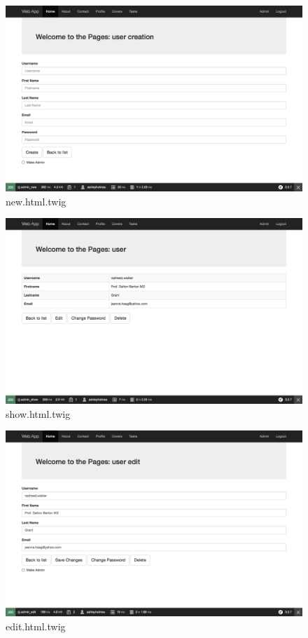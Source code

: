 \begin{figure}[htbp]
   \centering
   \includegraphics[width=400pt]{figures/new_html_twig.png} %
   \caption{new.html.twig}
   \label{fig:new.html.twig}
\end{figure}

\begin{figure}[htbp]
   \centering
   \includegraphics[width=400pt]{figures/show_html_twig.png} %
   \caption{show.html.twig}
   \label{fig:show.html.twig}
\end{figure}

\begin{figure}[htbp]
   \centering
   \includegraphics[width=400pt]{figures/edit_html_twig.png} %
   \caption{edit.html.twig}
   \label{fig:edit.html.twig}
\end{figure}

